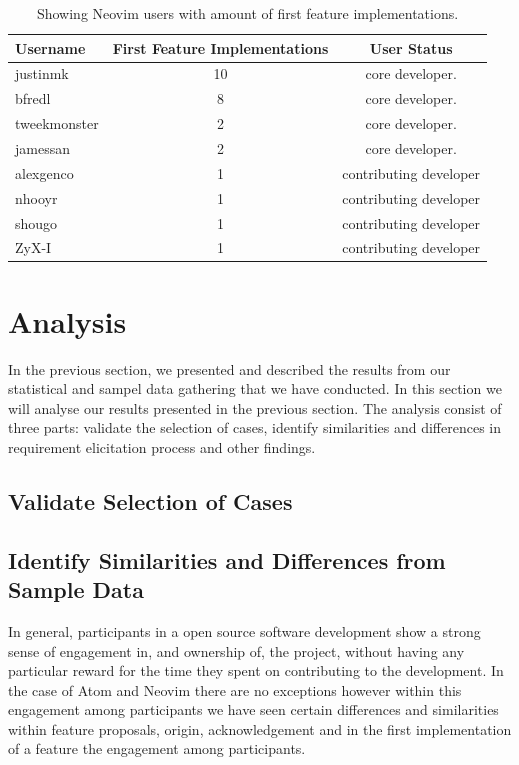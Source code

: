 \documentclass[a4paper,11pt]{article}
\begin{document}
{\begin{table}[h]
\end{table}
\begin{table}[h]
	\centering
	\begin{tabular}{ | l | c | c |}
		\hline
		\textbf{Username} 	& \textbf{First Feature Implementations}	& \textbf{User Status}	\\\hline
		justinmk			& 10 								& core developer. 		\\\hline
		bfredl			& 8 								& core developer. 		\\\hline
		tweekmonster		& 2 								& core developer. 		\\\hline
		jamessan			& 2 								& core developer. 		\\\hline
		alexgenco			& 1		 						& contributing developer	\\\hline
		nhooyr			& 1 								& contributing developer	\\\hline
		shougo			& 1 								& contributing developer	\\\hline
		ZyX-I			& 1		 						& contributing developer	\\
		\hline
	\end{tabular}
	\caption{Showing Neovim users with amount of first feature implementations.}
\end{table}

\FloatBarrier
\newpage
\section{Analysis}
In the previous section, we presented and described the results from our statistical and sampel data gathering that we have conducted.
In this section we will analyse our results presented in the previous section. The analysis consist of three parts: validate the selection of cases, identify similarities and differences in requirement elicitation process and other findings.

\subsection{Validate Selection of Cases}

\subsection{Identify Similarities and Differences from Sample Data}
In general, participants in a open source software development show a strong sense of engagement in, and ownership of, the project, without having any particular reward for the time they spent on contributing to the development. In the case of Atom and Neovim there are no exceptions however within this engagement among participants we have seen certain differences and similarities within feature proposals, origin, acknowledgement and in the first implementation of a feature the engagement among participants.

}
\end{document}
